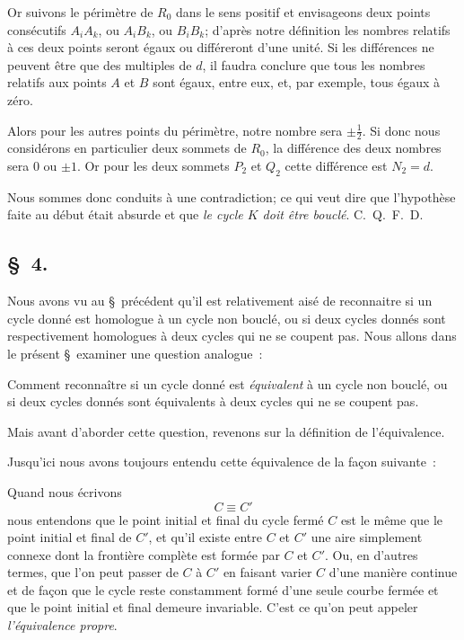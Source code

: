 \documentclass{article}
\begin{document}
Or suivons le périmètre de $R_{0}$ dans le sens positif et envisageons deux points consécutifs $A_{i}A_{k}$, ou $A_{i}B_{k}$, ou $B_{i}B_{k}$; d'après notre définition les nombres relatifs à ces deux points seront égaux ou différeront d'une unité. Si les différences ne peuvent être que des multiples de $d$, il faudra conclure que tous les nombres relatifs aux points $A$ et $B$ sont égaux, entre eux, et, par exemple, tous égaux à zéro.

Alors pour les autres points du périmètre, notre nombre sera $\pm \frac{1}{2}$. Si donc nous considérons en particulier deux sommets de $R_{0}$, la différence des deux nombres sera 0 ou $\pm 1$. Or pour les deux sommets $P_{2}$ et $Q_{2}$ cette différence est $N_{2} = d$.

Nous sommes donc conduits à une contradiction; ce qui veut dire que l'hypothèse faite au début était absurde et que \emph{le cycle $K$ doit être bouclé}. C.~Q.~F.~D.

\subsection*{\S~4.}

Nous avons vu au \S\ précédent qu'il est relativement aisé de reconnaitre si un cycle donné est homologue à un cycle non bouclé, ou si deux cycles donnés sont respectivement homologues à deux cycles qui ne se coupent pas. Nous allons dans le présent \S\ examiner une question analogue~:

Comment reconnaître si un cycle donné est \emph{équivalent} à un cycle non bouclé, ou si deux cycles donnés sont équivalents à deux cycles qui ne se coupent pas.

Mais avant d'aborder cette question, revenons sur la définition de l'équivalence.

Jusqu'ici nous avons toujours entendu cette équivalence de la façon suivante~:


Quand nous écrivons
\[ C \equiv C' \]
nous entendons que le point initial et final du cycle fermé $C$ est le même que le point initial et final de $C'$, et qu'il existe entre $C$ et $C'$ une aire simplement connexe dont la frontière complète est formée par $C$ et $C'$. Ou, en d'autres termes, que l'on peut passer de $C$ à $C'$ en faisant varier $C$ d'une manière continue et de façon que le cycle reste constamment formé d'une seule courbe fermée et que le point initial et final demeure invariable. C'est ce qu'on peut appeler \emph{l'équivalence propre}.
\end{document}
